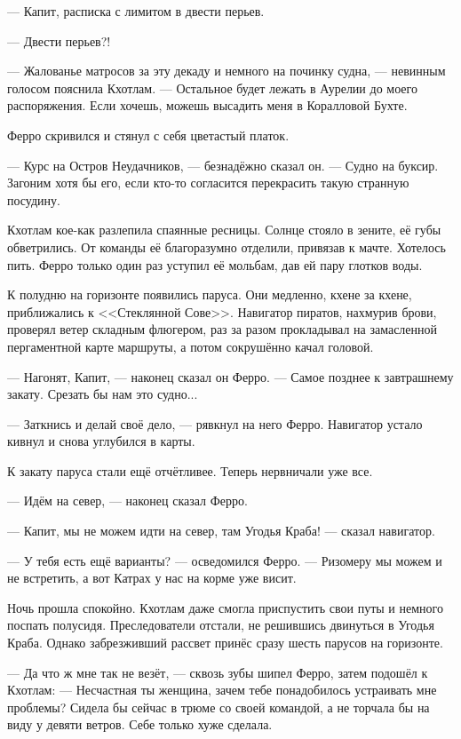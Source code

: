 --- Капит, расписка с лимитом в двести перьев.

--- Двести перьев?!

--- Жалованье матросов за эту декаду и немного на починку судна, --- невинным голосом пояснила Кхотлам.
--- Остальное будет лежать в Аурелии до моего распоряжения.
Если хочешь, можешь высадить меня в Коралловой Бухте.

Ферро скривился и стянул с себя цветастый платок.

--- Курс на Остров Неудачников, --- безнадёжно сказал он.
--- Судно на буксир.
Загоним хотя бы его, если кто-то согласится перекрасить такую странную посудину.

\asterism

Кхотлам кое-как разлепила спаянные ресницы.
Солнце стояло в зените, её губы обветрились.
От команды её благоразумно отделили, привязав к мачте.
Хотелось пить.
Ферро только один раз уступил её мольбам, дав ей пару глотков воды.

К полудню на горизонте появились паруса.
Они медленно, кхене за кхене, приближались к <<Стеклянной Сове>>.
Навигатор пиратов, нахмурив брови, проверял ветер складным флюгером, раз за разом прокладывал на замасленной пергаментной карте маршруты, а потом сокрушённо качал головой.

--- Нагонят, Капит, --- наконец сказал он Ферро.
--- Самое позднее к завтрашнему закату.
Срезать бы нам это судно...

--- Заткнись и делай своё дело, --- рявкнул на него Ферро.
Навигатор устало кивнул и снова углубился в карты.

К закату паруса стали ещё отчётливее.
Теперь нервничали уже все.

--- Идём на север, --- наконец сказал Ферро.

--- Капит, мы не можем идти на север, там Угодья Краба! --- сказал навигатор.

--- У тебя есть ещё варианты? --- осведомился Ферро.
--- Ризомеру мы можем и не встретить, а вот Катрах у нас на корме уже висит.

Ночь прошла спокойно.
Кхотлам даже смогла приспустить свои путы и немного поспать полусидя.
Преследователи отстали, не решившись двинуться в Угодья Краба.
Однако забрезживший рассвет принёс сразу шесть парусов на горизонте.

--- Да что ж мне так не везёт, --- сквозь зубы шипел Ферро, затем подошёл к Кхотлам:
--- Несчастная ты женщина, зачем тебе понадобилось устраивать мне проблемы?
Сидела бы сейчас в трюме со своей командой, а не торчала бы на виду у девяти ветров.
Себе только хуже сделала.


